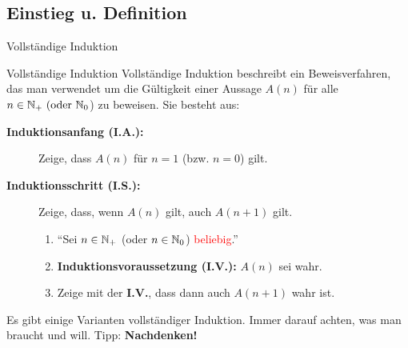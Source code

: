 \subsection{Einstieg u. Definition}
\begin{frame}{Vollständige Induktion}
	\begin{block}{Vollständige Induktion}
		Vollständige Induktion beschreibt ein Beweisverfahren, das man verwendet um die Gültigkeit einer Aussage \(A(n)\) für alle \(n \in \mathbb{N}_+ \text{ (oder } \mathbb{N}_{0}\)) zu beweisen. Sie besteht aus: \\[.5em]
		\begin{description}
			\item [\textbf{Induktionsanfang (I.A.):}] Zeige, dass \(A(n)\) für \(n=1\) (bzw. \(n=0\)) gilt.
			\item [\textbf{Induktionsschritt (I.S.):}] Zeige, dass, wenn \(A(n)\) gilt, auch \(A(n+1)\) gilt.
				\begin{enumerate}
					\item \enquote{Sei $n \in \mathbb{N}_+$ (oder $n \in \mathbb{N}_0$) \textcolor{red}{beliebig}.}
					\item \textbf{Induktionsvoraussetzung (I.V.):} $A(n)$ sei wahr.
					\item Zeige mit der \textbf{I.V.}, dass dann auch $A(n+1)$ wahr ist.
				\end{enumerate}
		\end{description}
	\end{block}

	\begin{alertblock}{}
		Es gibt einige Varianten vollständiger Induktion. Immer darauf achten, was man braucht und will. Tipp: \textbf{Nachdenken!}
	\end{alertblock}
\end{frame}
